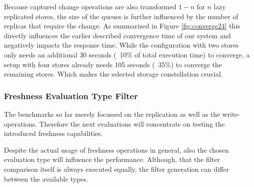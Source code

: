 Because captured change operations are also transformed $1-n$ for $n$ lazy replicated stores, the size of the queues is further influenced by the number of replicas that
require the change. 
As summarized in Figure \ref{fig:converge24} this directly influences the earlier described convergence time of our system and negatively impacts the response time.
While the configuration with two stores only needs an additional 30 seconds (~10\% of total execution time) to converge, a setup with four stores
already needs 105 seconds (~35\%) to converge the remaining stores.
Which makes the selected storage constellation crucial.









\subsubsection{Freshness Evaluation Type Filter} 

The benchmarks so far merely focussed on the replication as well as the write-operations.
Therefore the next evaluations will concentrate on testing the introduced freshness capabilities.

Despite the actual usage of freshness operations in general, also the chosen evaluation type will influence the performance.
Although, that the filter comparison itself is always executed equally, the filter generation can differ between the available types.

